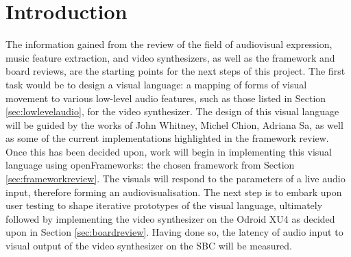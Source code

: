 \documentclass[../initial_thesis.tex]{subfiles}
\begin{document}
\section{Introduction}


The information gained from the review of the field of audiovisual expression, music feature extraction, and video synthesizers, as well as the framework and board reviews, are the starting points for the next steps of this project. The first task would be to design a visual language: a mapping of forms of visual movement to various low-level audio features, such as those listed in Section \ref{sec:lowlevelaudio}, for the video synthesizer. The design of this visual language will be guided by the works of John Whitney, Michel Chion, Adriana Sa, as well as some of the current implementations highlighted in the framework review. Once this has been decided upon, work will begin in implementing this visual language using openFrameworks: the chosen framework from Section \ref{sec:frameworkreview}. The visuals will respond to the parameters of a live audio input, therefore forming an audiovisualisation. The next step is to embark upon user testing to shape iterative prototypes of the visual language, ultimately followed by implementing the video synthesizer on the Odroid XU4 as decided upon in Section \ref{sec:boardreview}. Having done so, the latency of audio input to visual output of the video synthesizer on the SBC will be measured.
\end{document}
